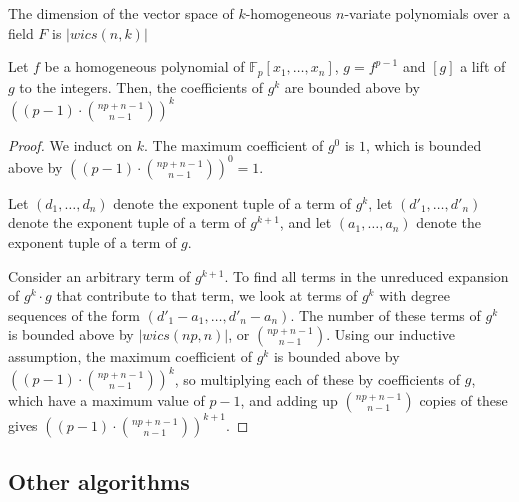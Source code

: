 \begin{rmk}
    The dimension of the vector space of $k$-homogeneous $n$-variate polynomials over a field $F$ is $|wics(n, k)|$
\end{rmk}

\begin{thm}
    Let $f$ be a homogeneous polynomial of $\mathbb{F}_p[x_1, \dots, x_n]$, $g = f ^ {p - 1}$ and $[g]$ a lift of $g$ to the integers. Then, the coefficients of $g ^ k$ are bounded above by $((p - 1) \cdot \binom{np + n - 1}{n - 1}) ^ k$
\end{thm}

\begin{proof}
    We induct on $k$. The maximum coefficient of $g^0$ is $1$, which is bounded above by $((p - 1) \cdot \binom{np + n - 1}{n - 1}) ^ 0 = 1$.
    
    Let $(d_1, \dots , d_n)$ denote the exponent tuple of a term of $g^k$, let $(d'_1, \dots , d'_n)$ denote the exponent tuple of a term of $g^{k + 1}$, and let $(a_1, \dots , a_n)$ denote the exponent tuple of a term of $g$.

    Consider an arbitrary term of $g^{k + 1}$. To find all terms in the unreduced expansion of $g^k \cdot g$ that contribute to that term, we look at terms of $g^k$ with degree sequences of the form $(d'_1 - a_1, \dots , d'_n - a_n)$. The number of these terms of $g^k$ is bounded above by $|wics(np, n)|$, or $\binom{np + n - 1}{n - 1}$. Using our inductive assumption, the maximum coefficient of $g^k$ is bounded above by $((p - 1) \cdot \binom{np + n - 1}{n - 1}) ^ k$, so multiplying each of these by coefficients of $g$, which have a maximum value of $p - 1$, and adding up $\binom{np + n - 1}{n - 1}$ copies of these gives $((p - 1) \cdot \binom{np + n - 1}{n - 1}) ^ {k + 1}$.
\end{proof}


\subsection{Other algorithms}

